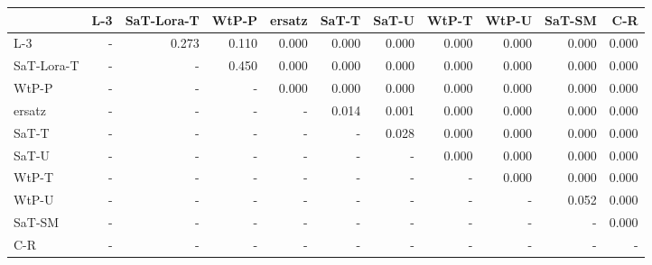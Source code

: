 \begin{tabular}{lrrrrrrrrrr}
\toprule
 & L-3 & SaT-Lora-T & WtP-P & ersatz & SaT-T & SaT-U & WtP-T & WtP-U & SaT-SM & C-R \\
\midrule
L-3 & - & 0.273 & 0.110 & 0.000 & 0.000 & 0.000 & 0.000 & 0.000 & 0.000 & 0.000 \\
SaT-Lora-T & - & - & 0.450 & 0.000 & 0.000 & 0.000 & 0.000 & 0.000 & 0.000 & 0.000 \\
WtP-P & - & - & - & 0.000 & 0.000 & 0.000 & 0.000 & 0.000 & 0.000 & 0.000 \\
ersatz & - & - & - & - & 0.014 & 0.001 & 0.000 & 0.000 & 0.000 & 0.000 \\
SaT-T & - & - & - & - & - & 0.028 & 0.000 & 0.000 & 0.000 & 0.000 \\
SaT-U & - & - & - & - & - & - & 0.000 & 0.000 & 0.000 & 0.000 \\
WtP-T & - & - & - & - & - & - & - & 0.000 & 0.000 & 0.000 \\
WtP-U & - & - & - & - & - & - & - & - & 0.052 & 0.000 \\
SaT-SM & - & - & - & - & - & - & - & - & - & 0.000 \\
C-R & - & - & - & - & - & - & - & - & - & - \\
\bottomrule
\end{tabular}

